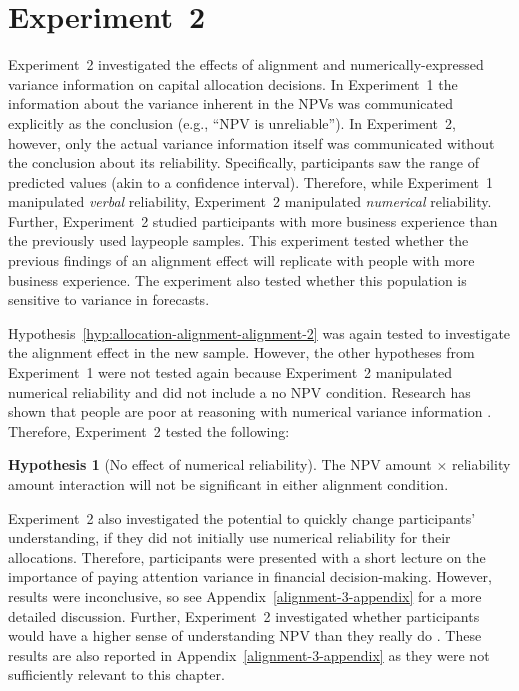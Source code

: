 \documentclass[a4paper, nobind, dvipsnames]{templates/ociamthesis}
\theoremstyle{definition}
\theoremstyle{definition}
\theoremstyle{definition}
\theoremstyle{definition}
\newtheorem{hypothesis}{Hypothesis}[chapter]
\theoremstyle{remark}
\begin{document}
\hypertarget{alignment-3}{%
\section{Experiment~2}\label{alignment-3}}

Experiment~2 investigated the effects of alignment and numerically-expressed
variance information on capital allocation decisions. In Experiment~1 the
information about the variance inherent in the NPVs was communicated explicitly
as the conclusion (e.g., ``NPV is unreliable''). In Experiment~2, however, only
the actual variance information itself was communicated without the conclusion
about its reliability. Specifically, participants saw the range of predicted
values (akin to a confidence interval). Therefore, while Experiment~1
manipulated \emph{verbal} reliability, Experiment~2 manipulated \emph{numerical}
reliability. Further, Experiment~2 studied participants with more business
experience than the previously used laypeople samples. This experiment tested
whether the previous findings of an alignment effect will replicate with people
with more business experience. The experiment also tested whether this
population is sensitive to variance in forecasts.

Hypothesis~\ref{hyp:allocation-alignment-alignment-2} was again tested to
investigate the alignment effect in the new sample. However, the other
hypotheses from Experiment~1 were not tested again because Experiment~2
manipulated numerical reliability and did not include a no NPV condition.
Research has shown that people are poor at reasoning with numerical variance
information \autocite{galesic2010,konold1993,vivalt2021,batteux2020}. Therefore,
Experiment~2 tested the following:

\begin{hypothesis}[No effect of numerical reliability]
\protect\hypertarget{hyp:allocation-npv-reliability-alignment-3}{}{\label{hyp:allocation-npv-reliability-alignment-3} {} }The NPV amount \(\times\) reliability amount interaction will not be significant
in either alignment condition.
\end{hypothesis}

Experiment~2 also investigated the potential to quickly change participants'
understanding, if they did not initially use numerical reliability for their
allocations. Therefore, participants were presented with a short lecture on the
importance of paying attention variance in financial decision-making. However,
results were inconclusive, so see Appendix~\ref{alignment-3-appendix} for a
more detailed discussion. Further, Experiment~2 investigated whether
participants would have a higher sense of understanding NPV than they really do
\autocite[as in][]{long2018}. These results are also reported in
Appendix~\ref{alignment-3-appendix} as they were not sufficiently relevant to
this chapter.
\end{document}
